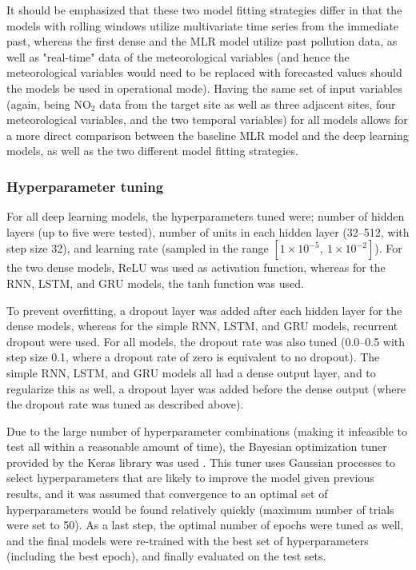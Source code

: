 It should be emphasized that these two model fitting strategies differ in that the models with rolling windows utilize multivariate time series from the immediate past, whereas the first dense and the MLR model utilize past pollution data, as well as "real-time" data of the meteorological variables (and hence the meteorological variables would need to be replaced with forecasted values should the models be used in operational mode). Having the same set of input variables (again, being NO$_2$ data from the target site as well as three adjacent sites, four meteorological variables, and the two temporal variables) for all models allows for a more direct comparison between the baseline MLR model and the deep learning models, as well as the two different model fitting strategies. 

\subsubsection{Hyperparameter tuning}
\label{sec:tuning_deep_learning}
For all deep learning models, the hyperparameters tuned were; number of hidden layers (up to five were tested), number of units in each hidden layer (32--512, with step size 32), and learning rate (sampled in the range $[1\times10^{-5},\: 1\times10^{-2}]$). For the two dense models, ReLU was used as activation function, whereas for the RNN, LSTM, and GRU models, the tanh function was used. 

To prevent overfitting, a dropout layer was added after each hidden layer for the dense models, whereas for the simple RNN, LSTM, and GRU models, recurrent dropout were used. For all models, the dropout rate was also tuned (0.0--0.5 with step size 0.1, where a dropout rate of zero is equivalent to no dropout). The simple RNN, LSTM, and GRU models all had a dense output layer, and to regularize this as well, a dropout layer was added before the dense output (where the dropout rate was tuned as described above). 

Due to the large number of hyperparameter combinations (making it infeasible to test all within a reasonable amount of time), the Bayesian optimization tuner provided by the Keras library was used \cite{omalley2019kerastuner}. This tuner uses Gaussian processes to select hyperparameters that are likely to improve the model given previous results, and it was assumed that convergence to an optimal set of hyperparameters would be found relatively quickly (maximum number of trials were set to 50). 
As a last step, the optimal number of epochs were tuned as well, and the final models were re-trained with the best set of hyperparameters (including the best epoch), and finally evaluated on the test sets. 


